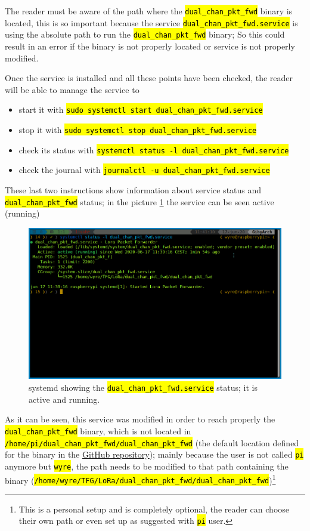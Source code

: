 \documentclass[11pt,a4paper,dvipsnames,twoside]{article}
\newcommand{\cmd}[1] {\hl{\texttt{#1}}}
\begin{document}
The reader must be aware of the path where the \cmd{dual\_chan\_pkt\_fwd} binary is located, this is so important because the service \cmd{dual\_chan\_pkt\_fwd.service} is using the absolute path to run the \cmd{dual\_chan\_pkt\_fwd} binary; So this could result in an error if the binary is not properly located or service is not properly modified.

Once the service is installed and all these points have been checked, the reader will be able to manage the service to

\begin{itemize}
  \item start it with \cmd{sudo systemctl start dual\_chan\_pkt\_fwd.service}
  \item stop it with \cmd{sudo systemctl stop dual\_chan\_pkt\_fwd.service}
  \item check its status with \cmd{systemctl status -l dual\_chan\_pkt\_fwd.service}
  \item check the journal with \cmd{journalctl -u dual\_chan\_pkt\_fwd.service}
\end{itemize}

These last two instructions show information about service status and \cmd{dual\_chan\_pkt\_fwd} status; in the picture \ref{fig:dual_chan_pkt_fwd-status} the service can be seen active (running)

\begin{figure}[ht]
  \centering
  \includegraphics[width=.9\textwidth]{../pictures/pkt_fwd-service.png}
  \caption{systemd showing the \cmd{dual\_chan\_pkt\_fwd.service} status; it is active and running.}
  \label{fig:dual_chan_pkt_fwd-status}
\end{figure}

As it can be seen, this service was modified in order to reach properly the \cmd{dual\_chan\_pkt\_fwd} binary, which is not located in \cmd{/home/pi/dual\_chan\_pkt\_fwd/dual\_chan\_pkt\_fwd} (the default location defined for the binary in the \href{https://github.com/dragino/dual_chan_pkt_fwd/blob/master/dual_chan_pkt_fwd.service#L9}{GitHub repository}); mainly because the user is not called \cmd{pi} anymore but \cmd{wyre}, the path needs to be modified to that path containing the binary (\cmd{/home/wyre/TFG/LoRa/dual\_chan\_pkt\_fwd/dual\_chan\_pkt\_fwd})\footnote{This is a personal setup and is completely optional, the reader can choose their own path or even set up as suggested with \cmd{pi} user.}
\end{document}
